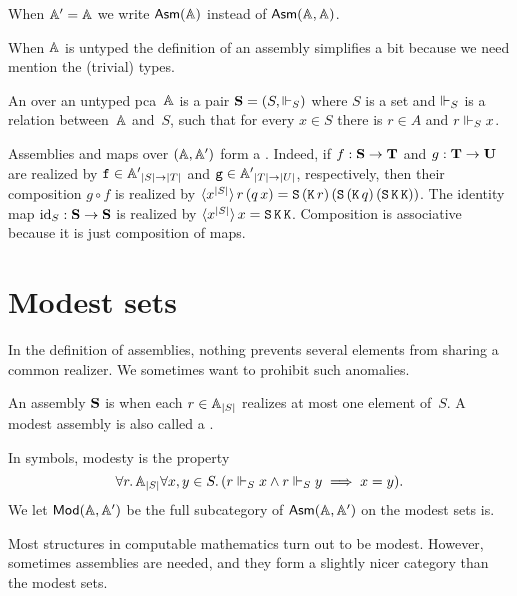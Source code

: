 When $\subAA = \AA$ we write $\Asm{\AA}$ instead of $\Asm{\AA,\AA}$.

When $\AA$ is untyped the definition of an assembly simplifies a bit because we need mention the (trivial) types.

\begin{definition}
  An  over an untyped pca~$\AA$ is a pair $\asm{S} = (S, {\rz_S})$ where $S$ is a set and $\rz_S$ is a relation between~$\AA$ and~$S$, such that for every $x \in S$ there is $r \in A$ and $r \rz_S x$.
\end{definition}

Assemblies and maps over $(\AA, \subAA)$ form a .
%
Indeed, if $f : \asm{S} \to \asm{T}$ and $g : \asm{T} \to \asm{U}$ are realized by $\R{f} \in \compAtyp{|S| \to |T|}$
and $\R{g} \in \compAtyp{|T| \to |U|}$, respectively, then their composition $g \circ f$ is realized by
$\tpcalam{x}{|S|}{r\,(q\,x)} = \combS\,(\combK\,r)\,(\combS\,(\combK\,q)\,(\combS\,\combK\,\combK))$.
%
The identity map $\id[S] : \asm{S} \to \asm{S}$ is realized by $\tpcalam{x}{|S|}{x} = \combS\,\combK\,\combK$. 
%
Composition is associative because it is just composition of maps.


\section{Modest sets}
\label{sec:modest-sets}

In the definition of assemblies, nothing prevents several elements from sharing a common realizer. We sometimes want
to prohibit such anomalies.

\begin{definition}
  An assembly $\asm{S}$ is  when each $r \in \xAtyp{S}$
  realizes at most one element of~$S$. A modest assembly is also
  called a .
\end{definition}

\noindent
In symbols, modesty is the property
%
\begin{equation*}
  \all{r}{\xAtyp{S}}{
    \all{x,y \in S}
      (r \rz_S x \land r \rz_S y \implies x = y)
  }.
\end{equation*}
%
We let $\ModA$ be the full subcategory of $\AsmA$ on the modest sets is.

Most structures in computable mathematics turn out to be modest. However, sometimes assemblies are needed, and they form a slightly nicer category than the modest sets.

